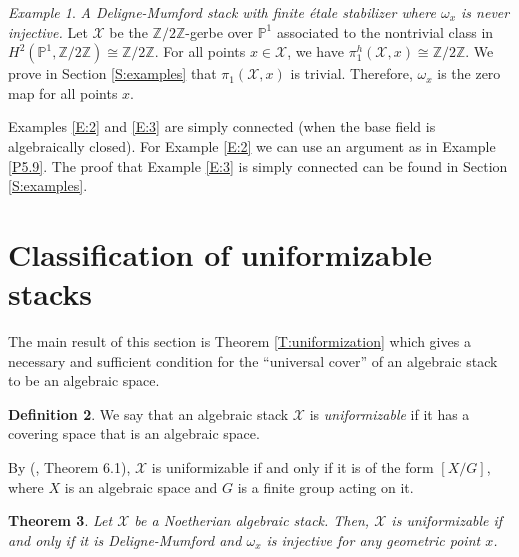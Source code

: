 \documentclass{amsart}
\newtheorem{thm}{Theorem}[section]
\theoremstyle{definition}
\newtheorem{defn}[thm]{Definition}
\theoremstyle{remark}
\theoremstyle{remark}
\newtheorem{ex}[thm]{Example}
\newcommand{\X}{\mathcal{X}}
\newcommand{\ox}{\omega_x}
\newcommand{\pX}{\pi_1(\X,x)}
\newcommand{\phX}{\pi_1^{h}(\X,x)}
\begin{document}
\begin{ex}{\label{E:3}}{\it A Deligne-Mumford stack with finite \'{e}tale
stabilizer where $\ox$ is never injective.} Let $\X$ be the
$\mathbb{Z}/2\mathbb{Z}$-gerbe over $\mathbb{P}^1$ associated to
the nontrivial class in $H^2(\mathbb{P}^1, \mathbb{Z}/2\mathbb{Z})
\cong \mathbb{Z}/2\mathbb{Z}$. For all points $x \in \X$, we have
$\phX \cong \mathbb{Z}/2\mathbb{Z}$. We prove in Section
\ref{S:examples} that $\pX$ is trivial. Therefore, $\ox$ is the
zero map for all points $x$.
\end{ex}

Examples \ref{E:2} and \ref{E:3}  are  simply connected (when the
base field is algebraically closed). For Example \ref{E:2} we can
use an argument as in Example \ref{P5.9}. The proof that Example
\ref{E:3} is simply connected can be found in Section
\ref{S:examples}.
\section{Classification of uniformizable stacks}

The main result of this section is Theorem \ref{T:uniformization}
which gives a necessary and sufficient condition for the
``universal cover'' of an algebraic stack to be an algebraic
space.

\begin{defn}
We say that an algebraic stack $\X$ is {\sl uniformizable} if it
has a covering  space that is an algebraic space.
\end{defn}

By (\cite{LM}, Theorem 6.1), $\X$ is uniformizable if and only if
it is of the form $[X/G]$, where $X$ is an algebraic space and $G$
is a finite group acting on it.

\begin{thm}{\label{T:uniformization}}%
Let $\X$ be a Noetherian algebraic stack. Then, $\X$ is
uniformizable if and only if it is Deligne-Mumford and $\ox$ is
injective for any geometric point $x$.
\end{thm}
\end{document}
